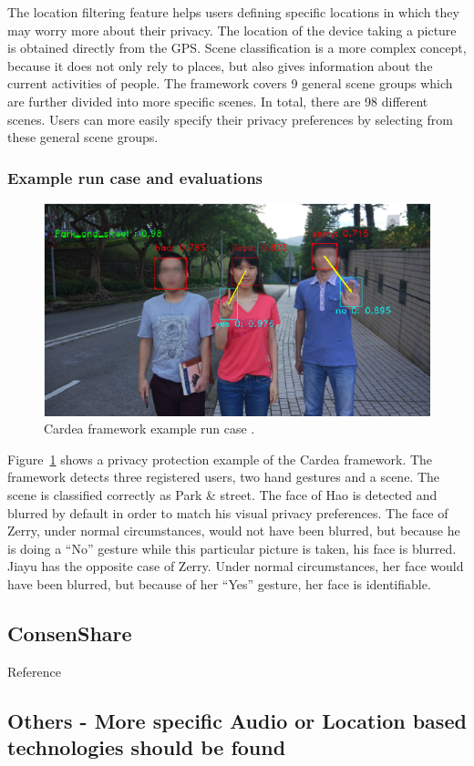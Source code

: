\documentclass[conference]{IEEEtran}
\begin{document}
The location filtering feature helps users defining specific locations in which they may worry more about their privacy. The location of the device taking a picture is obtained directly from the \ac{GPS}. Scene classification is a more complex concept, because it does not only rely to places, but also gives information about the current activities of people. The framework covers 9 general scene groups which are further divided into more specific scenes. In total, there are 98 different scenes. Users can more easily specify their privacy preferences by selecting from these general scene groups. 


\subsubsection{Example run case and evaluations}
\begin{figure}[t]
\centerline{\includegraphics[width=.5\textwidth]{img/cardea_example.png}}
\caption{Cardea framework example run case \cite{shu2016cardea}.}
\label{fig:cardea3}
\end{figure}

Figure~\ref{fig:cardea3} shows a privacy protection example of the Cardea framework. The framework detects three registered users, two hand gestures and a scene. The scene is classified correctly as Park \& street. The face of Hao is detected and blurred by default in order to match his visual privacy preferences. The face of Zerry, under normal circumstances, would not have been blurred, but because he is doing a “No” gesture while this particular picture is taken, his face is blurred. Jiayu has the opposite case of Zerry. Under normal circumstances, her face would have been blurred, but because of her “Yes” gesture, her face is identifiable.

\subsection{ConsenShare}\label{ConsenShare}
Reference \cite{olteanu2018consensual}

\subsection{Others - More specific Audio or Location based technologies should be found}
\end{document}
